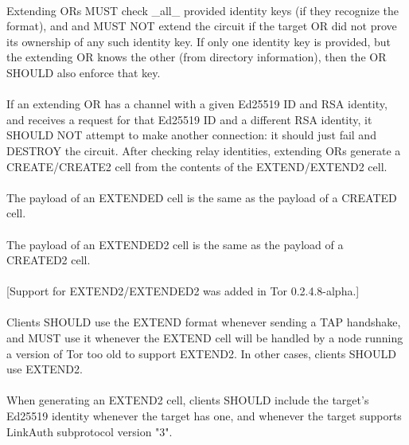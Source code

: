 \paragraph{}
Extending ORs MUST check \_all\_ provided identity keys (if they
recognize the format), and and MUST NOT extend the circuit if the
target OR did not prove its ownership of any such identity key.
If only one identity key is provided, but the extending OR knows
the other (from directory information), then the OR SHOULD also
enforce that key.

\paragraph{}
If an extending OR has a channel with a given Ed25519 ID and RSA
identity, and receives a request for that Ed25519 ID and a
different RSA identity, it SHOULD NOT attempt to make another
connection: it should just fail and DESTROY the circuit.
After checking relay identities, extending ORs generate a
CREATE/CREATE2 cell from the contents of the EXTEND/EXTEND2 cell.

\paragraph{}
The payload of an EXTENDED cell is the same as the payload of a
CREATED cell.

\paragraph{}
The payload of an EXTENDED2 cell is the same as the payload of a
CREATED2 cell.

\paragraph{}
[Support for EXTEND2/EXTENDED2 was added in Tor 0.2.4.8-alpha.]

\paragraph{}
Clients SHOULD use the EXTEND format whenever sending a TAP
handshake, and MUST use it whenever the EXTEND cell will be handled
by a node running a version of Tor too old to support EXTEND2. In
other cases, clients SHOULD use EXTEND2.

\paragraph{}
When generating an EXTEND2 cell, clients SHOULD include the target's
Ed25519 identity whenever the target has one, and whenever the
target supports LinkAuth subprotocol version "3".

